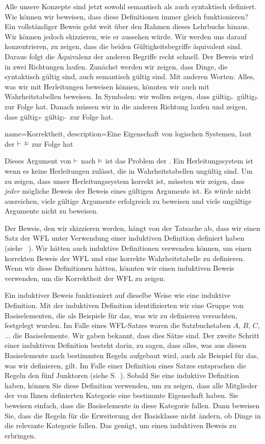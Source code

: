 Alle unsere Konzepte sind jetzt sowohl semantisch als auch syntaktisch definiert. Wie können wir beweisen, dass diese Definitionen immer gleich funktionieren? Ein vollständiger Beweis geht weit über den Rahmen dieses Lehrbuchs hinaus. Wir können jedoch skizzieren, wie er aussehen würde. Wir werden uns darauf konzentrieren, zu zeigen, dass die beiden Gültigkeitsbegriffe äquivalent sind.  Daraus folgt die Äquivalenz der anderen Begriffe recht schnell. Der Beweis wird in zwei Richtungen laufen. Zunächst werden wir zeigen, dass Dinge, die syntaktisch gültig sind, auch semantisch gültig sind. Mit anderen Worten: Alles, was wir mit Herleitungen beweisen können, könnten wir auch mit Wahrheitstabellen beweisen. In Symbolen: wir wollen zeigen, dass gültig$_{\vdash}$ gültig$_{\vDash}$ zur Folge hat. Danach müssen wir in die anderen Richtung laufen und zeigen, dass gültig$_{\vDash}$ gültig$_{\vdash}$ zur Folge hat.

{
name=Korrektheit,
description={Eine Eigenschaft von logischen Systemen, laut der $\vdash $ $\vDash $ zur Folge hat}
}

Dieses Argument von $\vdash $ nach $\vDash$ ist das Problem der . Ein Herleitungssystem ist  wenn es keine Herleitungen zulässt, die in Wahrheitstabellen ungültig sind. Um zu zeigen, dass unser Herleitungssystem korrekt ist, müssten wir zeigen, dass \emph{jeder} mögliche Beweis der Beweis eines gültigen Arguments ist. Es würde nicht ausreichen, viele gültige Argumente erfolgreich zu beweisen und viele ungültige Argumente nicht zu beweisen.

Der Beweis, den wir skizzieren werden, hängt von der Tatsache ab, dass wir einen Satz der WFL unter Verwendung einer induktiven Definition definiert haben (siehe ~\pageref{TFLsentences}). Wir hätten auch induktive Definitionen verwenden können, um einen korrekten Beweis der WFL und eine korrekte Wahrheitstabelle zu definieren. Wenn wir diese Definitionen hätten, könnten wir einen induktiven Beweis verwenden, um die Korrektheit der WFL zu zeigen. 

Ein induktiver Beweis funktioniert auf dieselbe Weise wie eine induktive Definition. Mit der induktiven Definition identifizierten wir eine Gruppe von Basiselementen, die als Beispiele für das, was wir zu definieren versuchten, festgelegt wurden. Im Falle eines WFL-Satzes waren die Satzbuchstaben $A$, $B$, $C$, $\dots$ die Basiselemente. Wir gaben bekannt, dass dies Sätze sind. Der zweite Schritt einer induktiven Definition besteht darin, zu sagen, dass alles, was aus diesen Basiselemente nach bestimmten Regeln aufgebaut wird, auch als Beispiel für das, was wir definieren, gilt. Im Falle einer Definition eines Satzes entsprachen die Regeln den fünf Junktoren (siehe S.~\pageref{TFLsentences}). Sobald Sie eine induktive Definition haben, können Sie diese Definition verwenden, um zu zeigen, dass alle Mitglieder der von Ihnen definierten Kategorie eine bestimmte Eigenschaft haben. Sie beweisen einfach, dass die Basiselemente in diese Kategorie fallen. Dann beweisen Sie, dass die Regeln für die Erweiterung der Basisklasse nicht ändern, ob Dinge in die relevante Kategorie fallen. Das genügt, um einen induktiven Beweis zu erbringen.


